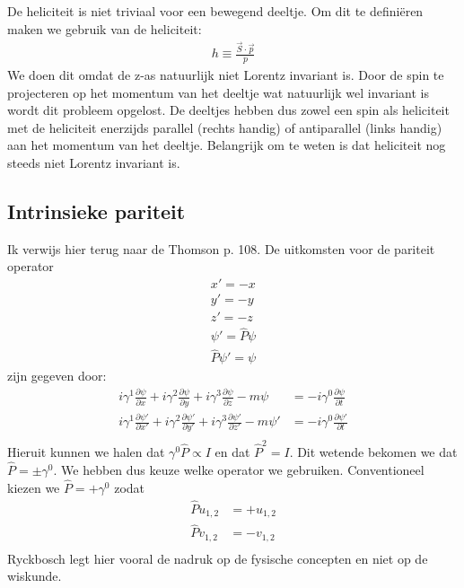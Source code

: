 \documentclass[../main.tex]{subfiles}
\begin{document}
De heliciteit is niet triviaal voor een bewegend deeltje. Om dit te definiëren maken we gebruik van de heliciteit:
\begin{equation}
    \begin{aligned}
        \label{eq:heliciteit}
        h \equiv \frac{\vec{S}\cdot\vec{p}}{p} 
    \end{aligned}
\end{equation}
We doen dit omdat de z-as natuurlijk niet Lorentz invariant is. Door de spin te projecteren op het momentum van het deeltje wat natuurlijk wel invariant is wordt dit probleem opgelost. De deeltjes hebben dus zowel een spin als heliciteit met de heliciteit enerzijds parallel (rechts handig) of antiparallel (links handig) aan het momentum van het deeltje. Belangrijk om te weten is dat heliciteit nog steeds niet Lorentz invariant is.

\subsection{Intrinsieke pariteit}%
\label{sub:intrinsieke_pariteit}

Ik verwijs hier terug naar de Thomson p. 108. De uitkomsten voor de pariteit operator
\begin{equation}
    \begin{aligned}
        \label{eq:dirac_par_op}
        x'=-x\\
        y'=-y\\
        z'=-z\\
        \psi'=\hat{P}\psi\\
        \hat{P}\psi'=\psi
    \end{aligned}
\end{equation}
zijn gegeven door:
\begin{equation}
    \begin{aligned}
        \label{eq:dirac_int_par}
        i\gamma^1 \frac{\partial \psi}{\partial x} + i\gamma^2 \frac{\partial \psi}{\partial y} + i\gamma^3 \frac{\partial \psi}{\partial z} - m\psi &= -i\gamma^0 \frac{\partial \psi}{\partial t}\\
        i\gamma^1 \frac{\partial \psi'}{\partial x'} + i\gamma^2 \frac{\partial \psi'}{\partial y'} + i\gamma^3 \frac{\partial \psi'}{\partial z'} - m\psi' &= -i\gamma^0 \frac{\partial \psi'}{\partial t}\\
    \end{aligned}
\end{equation}
Hieruit kunnen we halen dat $\gamma^0\hat{P} \propto I$ en dat $\hat{P}^2=I$. Dit wetende bekomen we dat $\hat{P}=\pm\gamma^0$. We hebben dus keuze welke operator we gebruiken. Conventioneel kiezen we $\hat{P}=+\gamma^0$ zodat
\begin{equation}
    \begin{aligned}
        \label{eq:par_u_v}
        \hat{P}u_{1,2} &= +u_{1,2}\\
        \hat{P}v_{1,2} &= -v_{1,2}\\
    \end{aligned}
\end{equation}
Ryckbosch legt hier vooral de nadruk op de fysische concepten en niet op de wiskunde.
\end{document}

